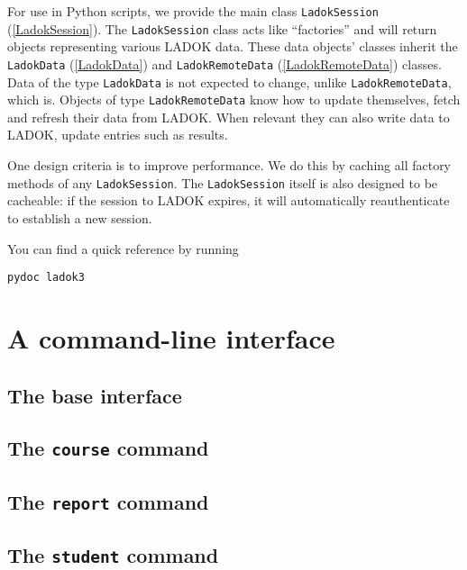 \documentclass[a4paper,oneside]{memoir}
\begin{document}
For use in Python scripts,
we provide the main class \texttt{LadokSession} (\cref{LadokSession}).
The \texttt{LadokSession} class acts like \enquote{factories} and will return 
objects representing various LADOK data.
These data objects' classes inherit the \texttt{LadokData} (\cref{LadokData}) 
and \texttt{LadokRemoteData} (\cref{LadokRemoteData}) classes.
Data of the type \texttt{LadokData} is not expected to change, unlike 
\texttt{LadokRemoteData}, which is.
Objects of type \texttt{LadokRemoteData} know how to update themselves, \ie fetch 
and refresh their data from LADOK.
When relevant they can also write data to LADOK, \ie update entries such as 
results.

One design criteria is to improve performance.
We do this by caching all factory methods of any \texttt{LadokSession}.
The \texttt{LadokSession} itself is also designed to be cacheable: if the session to 
LADOK expires, it will automatically reauthenticate to establish a new session.

You can find a quick reference by running
\begin{verbatim}
pydoc ladok3
\end{verbatim}



\part{A command-line interface}

\chapter{The base interface}



\chapter{The \texttt{course} command}



\chapter{The \texttt{report} command}



\chapter{The \texttt{student} command}
\end{document}
